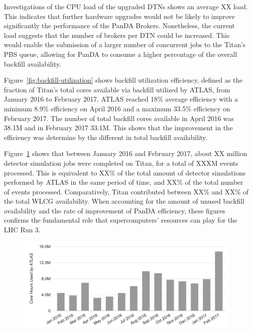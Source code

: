 Investigations of the CPU load of the upgraded DTNs shows an average
XX load. This indicates that further hardware
upgrades would not be likely to improve significantly the performance of the
PanDA Brokers. Nonetheless, the current load suggests that the number of brokers
per DTN could be increased. This would enable the submission of a larger number
of concurrent jobs to the Titan's PBS queue, allowing for PanDA to consume a
higher percentage of the overall backfill availability.

Figure~\ref{fig:backfill-utilization} shows backfill utilization efficiency,
defined as the fraction of Titan’s total cores available via backfill utilized
by ATLAS, from January 2016 to February 2017. ATLAS reached 18\% average
efficiency with a minimum 8.9\% efficiency on April 2016 and a maximum 33.5\%
efficiency on February 2017. The number of total backfill cores available in
April 2016 was 38.1M and in February 2017 33.1M. This shows that the improvement
in the efficiency was determine by the different in total backfill availability.

Figure~\ref{fig:hpc-workload-utilization} shows that between January 2016 and
February 2017, about XX million detector simulation jobs were completed on
Titan, for a total of XXXM events processed. This is equivalent to XX\% of the
total amount of detector simulations performed by ATLAS in the same period of
time, and XX\% of the total number of events processed. Comparatively, Titan
contributed between XX\% and XX\% of the total WLCG availability. When
accounting for the amount of unused backfill availability and the rate of
improvement of PanDA efficiency, these figures confirms the fundamental role
that supercomputers' resources can play for the LHC Run 3.

\begin{figure}[htp]
    \includegraphics[clip,width=\columnwidth]{figures/cpu_hours.png}
\caption{}
\label{fig:hpc-workload-utilization}
\end{figure}

